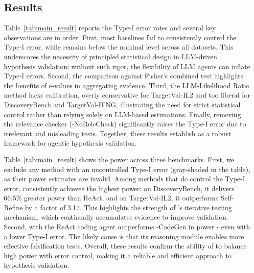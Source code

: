 \vspace{-0.5em}

\subsection{Results}

\vspace{-0.5em}

Table~\ref{tab:main_result} reports the Type-I error rates and several key observations are in order. 
First, most baselines fail to consistently control the Type-I error, while \mname remains below the nominal level across all datasets. 
This underscores the necessity of principled statistical design in LLM-driven hypothesis validation; 
without such rigor, the flexibility of LLM agents can inflate Type-I errors. 
Second, the comparison against Fisher's combined test highlights the benefits of e-values in aggregating evidence. 
Third, the LLM-Likelihood Ratio method lacks calibration, overly conservative for TargetVal-IL2 and too liberal for DiscoveryBench and TargetVal-IFNG, illustrating the need for strict statistical control rather than relying solely on LLM-based estimations. 
Finally, removing the relevance checker (\mname-NoReleCheck) significantly raises the Type-I error due to irrelevant and misleading tests. 
Together, these results establish \mname as a robust framework for agentic hypothesis validation.

\vspace{-0.5em}
Table~\ref{tab:main_result} shows the power across three benchmarks. 
First, we exclude any method with an uncontrolled Type-I error (gray-shaded in the table), as their power estimates are invalid. 
Among methods that do control the Type-I error, \mname consistently achieves the highest power: on DiscoveryBench, it delivers 66.5\% greater power than ReAct, and on TargetVal-IL2, it outperforms Self-Refine by a factor of 3.17. 
This highlights the strength of \mname's iterative testing mechanism, which continually accumulates evidence to improve validation. 
Second, \mname  with the ReAct coding agent outperforms \mname-CodeGen in power - even with a lower Type-I error. The likely cause is that its reasoning module enables more effective falsification tests. 
Overall, these results confirm the  ability of \mname to balance high power with error control, making it a reliable and efficient approach to hypothesis validation.


